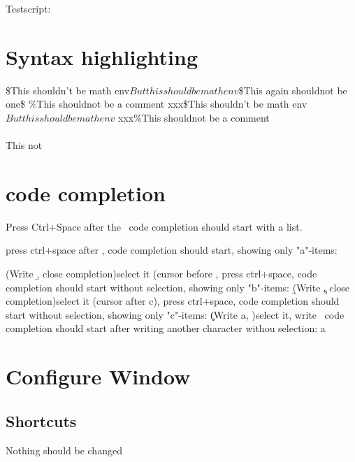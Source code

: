 Testscript:

\section{Syntax highlighting}
\$This shouldn't be math env$But this should be math env$\$This again shouldnot be one\$
\%This shouldnot be a comment%
xxx\$This shouldn't be math env$But this should be math env$
xxx\%This shouldnot be a comment%
\thisShouldBeACommand\\\ThisToo\\This not

\section{code completion}

Press Ctrl+Space after the \, code completion should start with a list. 
\

press ctrl+space after \a, code completion should start, showing only "a"-items:
\a


(Write \b, close completion)select it (cursor before \), press ctrl+space, code completion should start without selection, showing only "b"-items:
\b

(Write \c, close completion)select it (cursor after c), press ctrl+space, code completion should start without selection, showing only "c"-items:
\c

(Write a, )select it, write \, code completion should start after writing another character withou selection:
a

\section{Configure Window}
\subsection{Shortcuts}

   
Nothing should be changed

